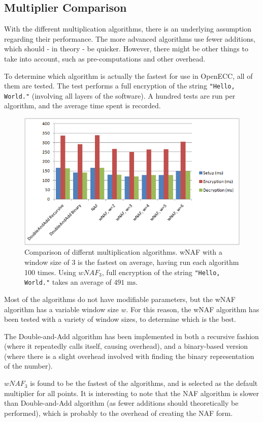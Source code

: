 \subsection{Multiplier Comparison}

With the different multiplication algorithms, there is an underlying assumption regarding their performance. The more
advanced algorithms use fewer additions, which should - in theory - be quicker. However, there might be other things
to take into account, such as pre-computations and other overhead.

To determine which algorithm is actually the fastest for use in OpenECC, all of them are tested. The test performs a
full  encryption of the string \verb+"Hello, World."+ (involving all layers of the software). A hundred tests are run
per algorithm, and the average time spent is recorded.

\begin{figure}[htb!]
	\centering
	\includegraphics[width=\textwidth]{performance/multipliers-comparison}
	\caption{Comparison of differnt multiplication algorithms. wNAF with a window size of 3 is the fastest on average,
		having run each algorithm 100 times. Using \(wNAF_3\), full encryption of the string \texttt{"Hello, World."}
		takes an average of \(491 \text{ ms}\).}
	\label{fig:multipliers-comparison}
\end{figure}

Most of the algorithms do not have modifiable parameters, but the wNAF algorithm has a variable window size \(w\). For
this reason, the wNAF algorithm has been tested with a variety of window sizes, to determine which is the best.

The Double-and-Add algorithm has been implemented in both a recursive fashion (where it repeatedly calls itself, causing
overhead), and a binary-based version (where there is a slight overhead involved with finding the binary representation
of the number).

\(wNAF_3\) is found to be the fastest of the algorithms, and is selected as the default multiplier for all points. It is
interesting to note that the NAF algorithm is slower than Double-and-Add algorithm (as fewer additions should theoretically
be performed), which is probably to the overhead of creating the NAF form.